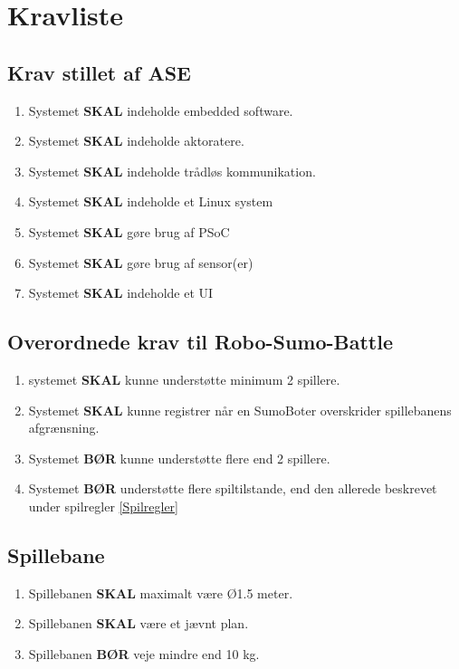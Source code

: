 \section{Kravliste}

\subsection{Krav stillet af ASE}
\begin{enumerate}
    \item Systemet \textbf{SKAL} indeholde embedded software.
    \item Systemet \textbf{SKAL} indeholde aktoratere.
    \item Systemet \textbf{SKAL} indeholde trådløs kommunikation.
    \item Systemet \textbf{SKAL} indeholde et Linux system
    \item Systemet \textbf{SKAL} gøre brug af PSoC
    \item Systemet \textbf{SKAL} gøre brug af sensor(er)
    \item Systemet \textbf{SKAL} indeholde et UI
\end{enumerate}

\subsection{Overordnede krav til Robo-Sumo-Battle}
\begin{enumerate}
    \item systemet \textbf{SKAL} kunne understøtte minimum 2 spillere.
    \item Systemet \textbf{SKAL} kunne registrer når en SumoBoter overskrider spillebanens afgrænsning.
    \item Systemet \textbf{BØR} kunne understøtte flere end 2 spillere.  
    \item Systemet \textbf{BØR} understøtte flere spiltilstande, end den allerede beskrevet under spilregler \ref{Spilregler}
\end{enumerate}

\subsection{Spillebane}
\begin{enumerate}
    \item Spillebanen \textbf{SKAL} maximalt være Ø1.5 meter.
    \item Spillebanen \textbf{SKAL} være et jævnt plan.
    \item Spillebanen \textbf{BØR} veje mindre end 10 kg.
\end{enumerate}

